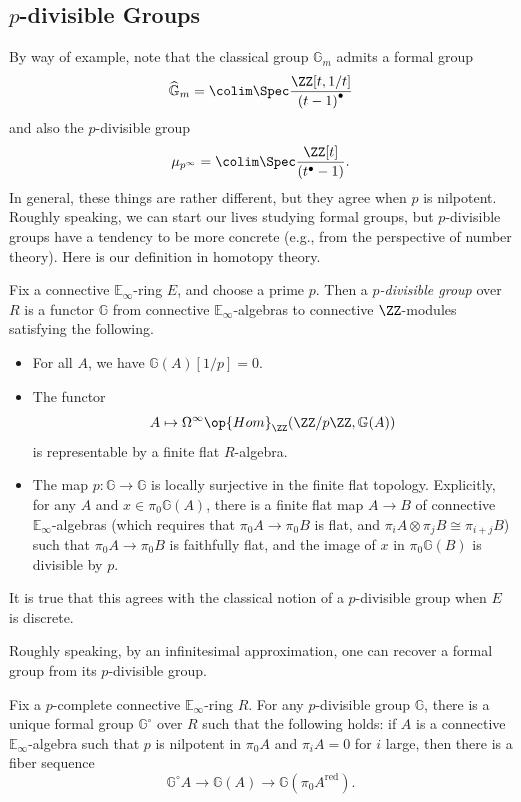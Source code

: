 \documentclass[../notes.tex]{subfiles}
\begin{document}
\subsection{\texorpdfstring{$p$}{ p}-divisible Groups}
By way of example, note that the classical group $\mathbb G_m$ admits a formal group
\[\widehat{\mathbb G}_m=\colim\Spec\frac{\ZZ[t,1/t]}{\left(t-1\right)^\bullet}\]
and also the $p$-divisible group
\[\mu_{p^\infty}=\colim\Spec\frac{\ZZ[t]}{\left(t^\bullet-1\right)}.\]
In general, these things are rather different, but they agree when $p$ is nilpotent. Roughly speaking, we can start our lives studying formal groups, but $p$-divisible groups have a tendency to be more concrete (e.g., from the perspective of number theory). Here is our definition in homotopy theory.
\begin{defihelper} 
	Fix a connective $\mathbb E_\infty$-ring $E$, and choose a prime $p$. Then a \textit{$p$-divis\-ible group} over $R$ is a functor $\mathbb G$ from connective $\mathbb E_\infty$-algebras to connective $\ZZ$-modules satisfying the following.
	\begin{itemize}
		\item For all $A$, we have $\mathbb G(A)[1/p]=0$.
		\item The functor
		\[A\mapsto\Omega^\infty\op{Hom}_\ZZ(\ZZ/p\ZZ,\mathbb G(A))\]
		is representable by a finite flat $R$-algebra.
		\item The map $p\colon\mathbb G\to\mathbb G$ is locally surjective in the finite flat topology. Explicitly, for any $A$ and $x\in\pi_0\mathbb G(A)$, there is a finite flat map $A\to B$ of connective $\mathbb E_\infty$-algebras (which requires that $\pi_0A\to\pi_0B$ is flat, and $\pi_iA\otimes\pi_jB\cong\pi_{i+j}B$) such that $\pi_0A\to\pi_0B$ is faithfully flat, and the image of $x$ in $\pi_0\mathbb G(B)$ is divisible by $p$.
	\end{itemize}
\end{defihelper}
\begin{remark}
	It is true that this agrees with the classical notion of a $p$-divisible group when $E$ is discrete.
\end{remark}
Roughly speaking, by an infinitesimal approximation, one can recover a formal group from its $p$-divisible group.
\begin{theorem}
	Fix a $p$-complete connective $\mathbb E_\infty$-ring $R$. For any $p$-divisible group $\mathbb G$, there is a unique formal group $\mathbb G^\circ$ over $R$ such that the following holds: if $A$ is a connective $\mathbb E_\infty$-algebra such that $p$ is nilpotent in $\pi_0A$ and $\pi_iA=0$ for $i$ large, then there is a fiber sequence
	\[\mathbb G^\circ A\to\mathbb G(A)\to\mathbb G(\pi_0A^{\mathrm{red}}).\]
\end{theorem}
\end{document}
